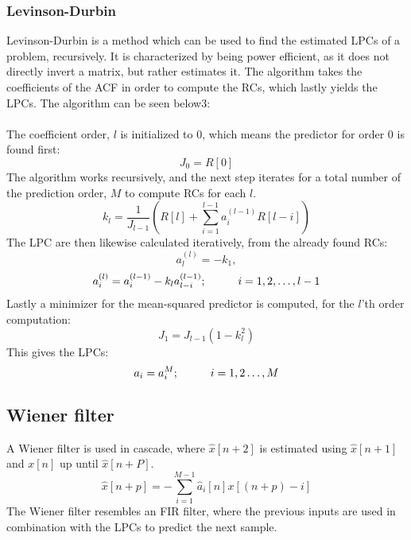 \subsubsection{Levinson-Durbin}
Levinson-Durbin is a method which can be used to find the estimated LPCs of a problem, recursively. It is characterized by being power efficient, as it does not directly invert a matrix, but rather estimates it.
The algorithm takes the coefficients of the ACF in order to compute the RCs, which lastly yields the LPCs. The algorithm can be seen below3:\\\\
The coefficient order, $l$ is initialized to 0, which means the predictor for order 0 is found first:
\begin{equation}\label{LDInit}
	J_0=R[0]
\end{equation}
The algorithm works recursively, and the next step iterates for a total number of the prediction order, $M$ to compute RCs for each $l$.
\begin{equation}\label{LDStep1}
	k_l=\frac{1}{J_{l-1}} \left ( R[l] + \sum_{i=1}^{l-1} a_i^{(l-1)}R[l-i]   \right) 
\end{equation}
The LPC are then likewise calculated iteratively, from the already found RCs: 
\vspace{-0mm}
\begin{equation}\label{LDStep2_1}
	a_l^{(l)} = -k_1,
\end{equation}
\vspace{-10mm}
\begin{equation}\label{LDStep2_2}
a_i^{(l)} = a_i^{(l-1)} - k_l a_{l-i}^{(l-1)} ; \hspace{10mm} i = 1,2,\dotsc,l-1
\end{equation}
Lastly a minimizer for the mean-squared predictor is computed, for the $l$'th order computation:
\begin{equation}\label{LDStep2}
	J_1 = J_{l-1} (1-k_l^2)
\end{equation}
This gives the LPCs:
\begin{equation}
	a_i = a_i^{M}; \hspace{10mm} i = 1,2 \dotsc , M
\end{equation}


\subsection{Wiener filter}
A Wiener filter is used in cascade, where $\hat{x}[n+2]$ is estimated using $\hat{x}[n+1]$ and $x[n]$ up until $\hat{x}[n+P]$. 
\begin{equation}\label{eq:AppPredictor}
\hat{x}[n+p] =- \sum^{M-1}_{i=1}\hat{a}_i[n]x[(n+p)-i]
\end{equation}
The Wiener filter resembles an FIR filter, where the previous inputs are used in combination with the LPCs to predict the next sample. 

